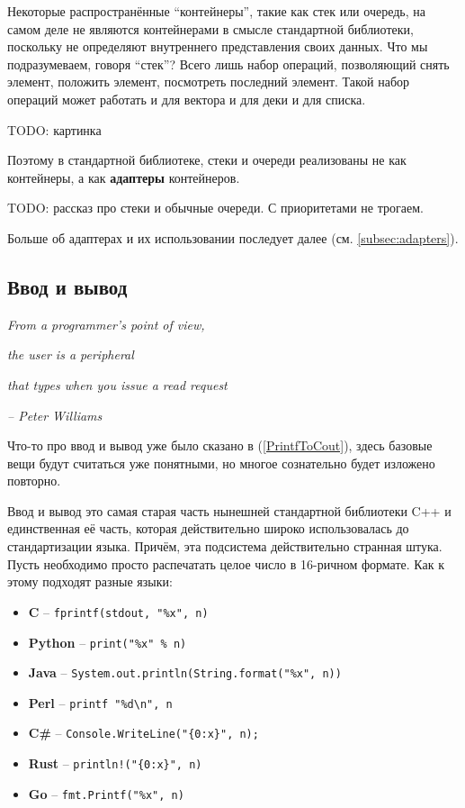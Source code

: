 \documentclass[a4paper,12pt,oneside]{article}
\begin{document}
Некоторые распространённые ``контейнеры'', такие как стек или очередь, на самом деле не являются контейнерами в смысле стандартной библиотеки, поскольку не определяют внутреннего представления своих данных. Что мы подразумеваем, говоря ``стек''? Всего лишь набор операций, позволяющий снять элемент, положить элемент, посмотреть последний элемент. Такой набор операций может работать и для вектора и для деки и для списка.

TODO: картинка

Поэтому в стандартной библиотеке, стеки и очереди реализованы не как контейнеры, а как \textbf{адаптеры} контейнеров.

TODO: рассказ про стеки и обычные очереди. С приоритетами не трогаем.

Больше об адаптерах и их использовании последует далее (см. \ref{subsec:adapters}).

\pagebreak
\subsection{Ввод и вывод}\label{subsec:iostreams}

\hfill\textit{From a programmer's point of view,}

\hfill\textit{the user is a peripheral}

\hfill\textit{that types when you issue a read request}{\vspace{0.5em}}

\hfill\textit{-- Peter Williams} 

Что-то про ввод и вывод уже было сказано в (\ref{PrintfToCout}), здесь базовые вещи будут считаться уже понятными, но многое сознательно будет изложено повторно. 

Ввод и вывод это самая старая часть нынешней стандартной библиотеки C++ и единственная её часть, которая действительно широко использовалась до стандартизации языка. Причём, эта подсистема действительно странная штука. Пусть необходимо просто распечатать целое число в 16-ричном формате. Как к этому подходят разные языки:

\begin{itemize}
\item \textbf{C } -- \lstinline!fprintf(stdout, "%x", n)!
\item \textbf{Python} -- \lstinline!print("%x" % n)!
\item \textbf{Java} -- \lstinline!System.out.println(String.format("%x", n))!
\item \textbf{Perl} -- \lstinline!printf "%d\n", n!
\item \textbf{C\#} -- \lstinline!Console.WriteLine("{0:x}", n);!
\item \textbf{Rust} -- \lstinline?println!("{0:x}", n)?
\item \textbf{Go} -- \lstinline!fmt.Printf("%x", n)!
\end{itemize}
\end{document}
